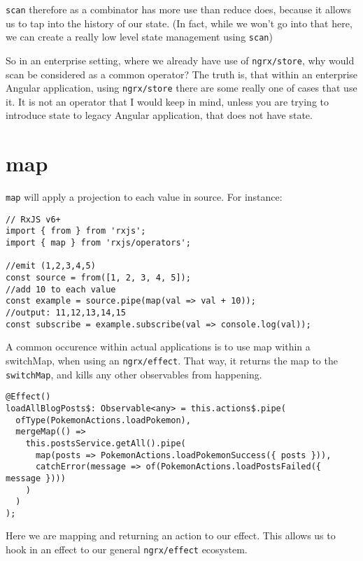 \lstinline{scan} therefore as a combinator has more use than reduce does, 
because it allows us to tap into the history of our state. (In fact, while we
won't go into that here, we can create a really low level state management 
using \lstinline{scan})

So in an enterprise setting, where we already have use of 
\lstinline{ngrx/store}, why would scan be considered as a common operator? The 
truth is, that within an enterprise Angular application, using \lstinline{ngrx/store}
there are some really one of cases that use it. It is not an operator that I would keep 
in mind, unless you are trying to introduce state to legacy Angular application, 
that does not have state. 

\section{map} 
\lstinline{map} will apply a projection to each value in source. For instance: 
\begin{lstlisting}[caption=rxjs map example]
// RxJS v6+
import { from } from 'rxjs';
import { map } from 'rxjs/operators';

//emit (1,2,3,4,5)
const source = from([1, 2, 3, 4, 5]);
//add 10 to each value
const example = source.pipe(map(val => val + 10));
//output: 11,12,13,14,15
const subscribe = example.subscribe(val => console.log(val));
\end{lstlisting}

A common occurence within actual applications is to use map within a 
switchMap, when using an \lstinline{ngrx/effect}. That way, it returns the map
to the \lstinline{switchMap}, and kills any other observables from happening.

\begin{lstlisting}[caption=map example]
@Effect()
loadAllBlogPosts$: Observable<any> = this.actions$.pipe(
  ofType(PokemonActions.loadPokemon),
  mergeMap(() =>
    this.postsService.getAll().pipe(
      map(posts => PokemonActions.loadPokemonSuccess({ posts })),
      catchError(message => of(PokemonActions.loadPostsFailed({ message })))
    )
  )
);  
\end{lstlisting}

Here we are mapping and returning an action to our effect. This allows us to 
hook in an effect to our general \lstinline{ngrx/effect} ecosystem.